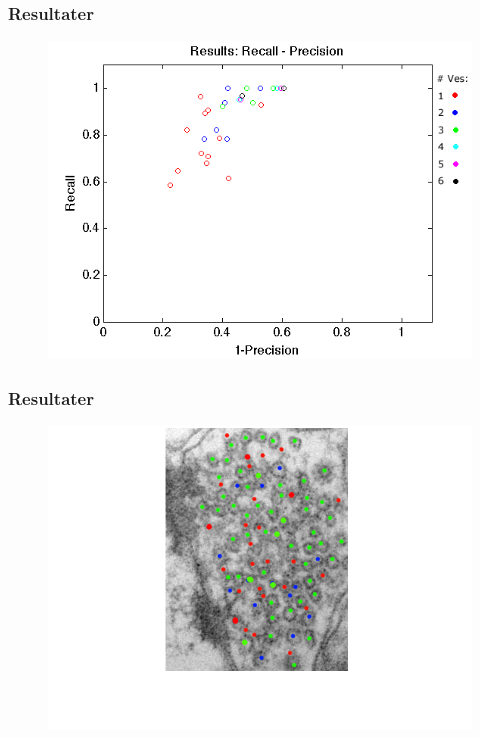 \documentclass[12pt,t]{beamer}
\begin{document}
\begin{frame}
\frametitle{Resultater}
\begin{figure}[H]
	\centering
	\includegraphics[scale=0.6]{img/finalmethod/recallvsprecision2.png}
\end{figure}
\end{frame}

\begin{frame}
\frametitle{Resultater}
\begin{figure}[H]
	\centering
	\includegraphics[scale=0.4]{img/afstand/res_3.png}
\end{figure}
\end{frame}
\end{document}
